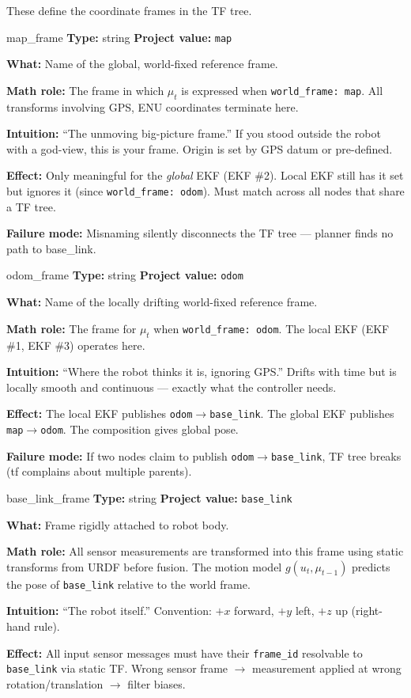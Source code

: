 \documentclass[11pt,a4paper]{article}
\begin{document}
These define the coordinate frames in the TF tree.

\begin{paramcard}{map\_frame}
\textbf{Type:} string \quad \textbf{Project value:} \texttt{map}

\textbf{What:} Name of the global, world-fixed reference frame.

\textbf{Math role:} The frame in which $\mu_t$ is expressed when \texttt{world\_frame: map}. All transforms involving GPS, ENU coordinates terminate here.

\textbf{Intuition:} ``The unmoving big-picture frame.'' If you stood outside the robot with a god-view, this is your frame. Origin is set by GPS datum or pre-defined.

\textbf{Effect:} Only meaningful for the \emph{global} EKF (EKF \#2). Local EKF still has it set but ignores it (since \texttt{world\_frame: odom}). Must match across all nodes that share a TF tree.

\textbf{Failure mode:} Misnaming silently disconnects the TF tree --- planner finds no path to base\_link.
\end{paramcard}

\begin{paramcard}{odom\_frame}
\textbf{Type:} string \quad \textbf{Project value:} \texttt{odom}

\textbf{What:} Name of the locally drifting world-fixed reference frame.

\textbf{Math role:} The frame for $\mu_t$ when \texttt{world\_frame: odom}. The local EKF (EKF \#1, EKF \#3) operates here.

\textbf{Intuition:} ``Where the robot thinks it is, ignoring GPS.'' Drifts with time but is locally smooth and continuous --- exactly what the controller needs.

\textbf{Effect:} The local EKF publishes \texttt{odom}$\to$\texttt{base\_link}. The global EKF publishes \texttt{map}$\to$\texttt{odom}. The composition gives global pose.

\textbf{Failure mode:} If two nodes claim to publish \texttt{odom}$\to$\texttt{base\_link}, TF tree breaks (tf complains about multiple parents).
\end{paramcard}

\begin{paramcard}{base\_link\_frame}
\textbf{Type:} string \quad \textbf{Project value:} \texttt{base\_link}

\textbf{What:} Frame rigidly attached to robot body.

\textbf{Math role:} All sensor measurements are transformed into this frame using static transforms from URDF before fusion. The motion model $g(u_t, \mu_{t-1})$ predicts the pose of \texttt{base\_link} relative to the world frame.

\textbf{Intuition:} ``The robot itself.'' Convention: $+x$ forward, $+y$ left, $+z$ up (right-hand rule).

\textbf{Effect:} All input sensor messages must have their \texttt{frame\_id} resolvable to \texttt{base\_link} via static TF. Wrong sensor frame $\to$ measurement applied at wrong rotation/translation $\to$ filter biases.
\end{paramcard}
\end{document}
